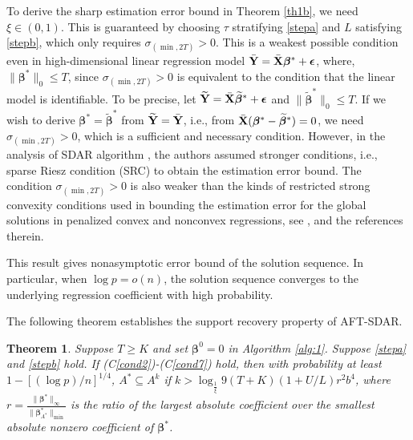\documentclass[12pt]{article}
\newtheorem{theorem}{Theorem}
\newcommand{\bX}{{\bf X}}
\newcommand{\bY}{\mbox{\bf Y}}
\newcommand{\bbeta}{\boldsymbol{\beta}}
\newcommand{\bepsilon}{\boldsymbol{\epsilon}}
\begin{document}
{
To derive   the sharp estimation error bound in Theorem \ref{th1b}, we need $\xi \in (0,1)$. This is guaranteed
by choosing $\tau $ stratifying  \eqref{stepa} and $L$ satisfying  \eqref{stepb}, which only requires $\sigma_{(\min,2T)} >0$. This is a weakest possible condition even  in high-dimensional linear regression model $\bar{\bY} = \bar{\bX}\bbeta^* + \bepsilon$, where, $\|\bbeta^*\|_0 \leq T$, since $\sigma_{(\min,2T)} >0$  is equivalent to the condition that the linear model is identifiable.
To be precise, let $\widetilde{\bY} = \bar{\bX}\widetilde{\bbeta}^* +\bepsilon$  and   $\|\widetilde{\bbeta}^*\|_0 \leq T.$   If we wish to derive $\bbeta^* = \widetilde{\bbeta}^*$ from $\widetilde{\bY }= \bar{\bY}$, i.e.,  from $\bar{\bX}(\bbeta^* - \widetilde{\bbeta}^*)=0$, we need $\sigma_{(\min,2T)} >0$, which is
a sufficient and necessary condition.
However, in the analysis of  SDAR algorithm
\citep{huang2018constructive},
the authors assumed  stronger conditions, i.e., sparse Riesz condition (SRC)
\citep{ZhangCun-Hui2008Tsab}
to obtain the  estimation error bound. The condition $\sigma_{(\min,2T)} >0$ is also  weaker  than the  kinds of restricted strong convexity conditions used in
bounding the estimation error for the global solutions in penalized convex and nonconvex regressions, see  \cite{Zhangzhang}, \cite{mw2019} and the references therein.
}

This result gives nonasymptotic error bound of the solution sequence.
In particular, when $\log p = o(n)$, the solution sequence converges
to the underlying regression coefficient with high probability.

The following theorem establishes the support recovery property of
AFT-SDAR.
\begin{theorem}
\label{th2}
Suppose $T \ge K$ and set $\bbeta^0=0$ in Algorithm \ref{alg:1}.
Suppose \eqref{stepa} and \eqref{stepb} hold.
If %
(C\ref{cond2})-(C\ref{cond7})
hold,
then with probability at least
$1- [{(\log p )}/{n}]^{{1}/{4}}$,
$A^*\subseteq A^k$ if $k> \log_{\frac{1}{\xi}} 9 (T+K)(1+U/L)r^2 b^4$, where $r = \frac{\|\bbeta^*\|_{\infty} }{\|\bbeta^*_{A^*}\|_{\min}}$ is the ratio of the largest absolute coefficient over the smallest absolute nonzero coefficient of $\bbeta^*$.
\end{theorem}
\end{document}
